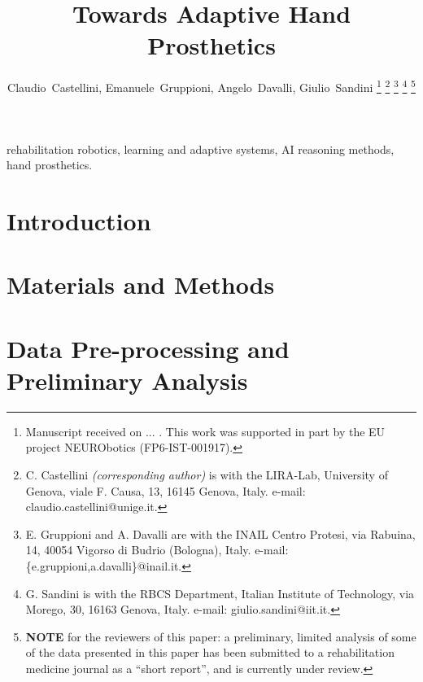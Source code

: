 \documentclass[journal]{IEEEtran}
\begin{document}
\title{Towards Adaptive Hand Prosthetics}

\author{Claudio~Castellini, Emanuele~Gruppioni, Angelo~Davalli, Giulio~Sandini%
\thanks{Manuscript received on ... . This work was supported in part
  by the EU project NEURObotics (FP6-IST-001917).}%
\thanks{C. Castellini \emph{(corresponding author)}
  is with the LIRA-Lab, University of Genova,
  viale F. Causa, 13, 16145 Genova, Italy.
  e-mail: claudio.castellini@unige.it.}%
\thanks{E. Gruppioni and A. Davalli
  are with the INAIL Centro Protesi,
  via Rabuina, 14, 40054 Vigorso di Budrio (Bologna), Italy.
  e-mail: \{e.gruppioni,a.davalli\}@inail.it.}%
\thanks{G. Sandini
  is with the RBCS Department, Italian Institute of Technology,
  via Morego, 30, 16163 Genova, Italy.
  e-mail: giulio.sandini@iit.it.}%
\thanks{\textbf{NOTE} for the reviewers of this paper: a preliminary,
  limited analysis of some of the data presented in this paper has
  been submitted to a rehabilitation medicine journal as a ``short
  report'', and is currently under review.}%
}

\maketitle

\begin{abstract}
  
\end{abstract}

\begin{IEEEkeywords}
  rehabilitation robotics, learning and adaptive systems, AI reasoning
  methods, hand prosthetics.
\end{IEEEkeywords}

\IEEEpeerreviewmaketitle

\section{Introduction}
\label{sec:intro}


\section{Materials and Methods}
\label{sec:m&ms}


\section{Data Pre-processing and Preliminary Analysis}
\label{sec:pre}

\end{document}
